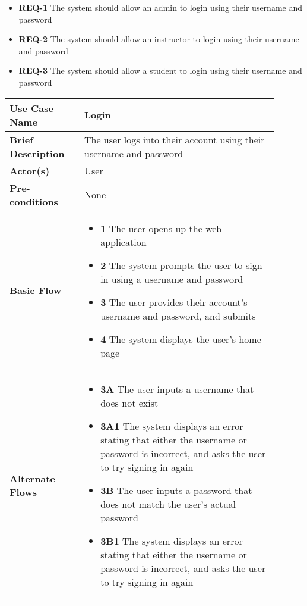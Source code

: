 \documentclass{article}
\begin{document}
\begin{itemize}
  \item \textbf{REQ-1} The system should allow an admin to login using their username and password
  \item \textbf{REQ-2} The system should allow an instructor to login using their username and password
  \item \textbf{REQ-3} The system should allow a student to login using their username and password
\end{itemize}


\vspace{0.1in}

\begin{tabular}{| p{0.25\linewidth} | p{0.65\linewidth} |}
  \hline
  \textbf{Use Case Name} & Login \\
  \hline
  \textbf{Brief Description} & The user logs into their account using their username and password \\
  \hline
  \textbf{Actor(s)} & User \\
  \hline
  \textbf{Pre-conditions} & None\\
  \hline
  \textbf{Basic Flow} & \begin{itemize}
    \item[] \textbf{1} The user opens up the web application
    \item[] \textbf{2} The system prompts the user to sign in using a username and password
    \item[] \textbf{3} The user provides their account's username and password, and submits
    \item[] \textbf{4} The system displays the user's home page
  \end{itemize}\\
  \hline
  \textbf{Alternate Flows} & \begin{itemize}
    \item[] \textbf{3A} The user inputs a username that does not exist
    \item[] \textbf{3A1} The system displays an error stating that either the username or password is incorrect, and asks the user to try signing in again
    \item[] \textbf{3B} The user inputs a password that does not match the user's actual password
    \item[] \textbf{3B1} The system displays an error stating that either the username or password is incorrect, and asks the user to try signing in again
  \end{itemize} \\
  \hline
\end{tabular}
\end{document}
